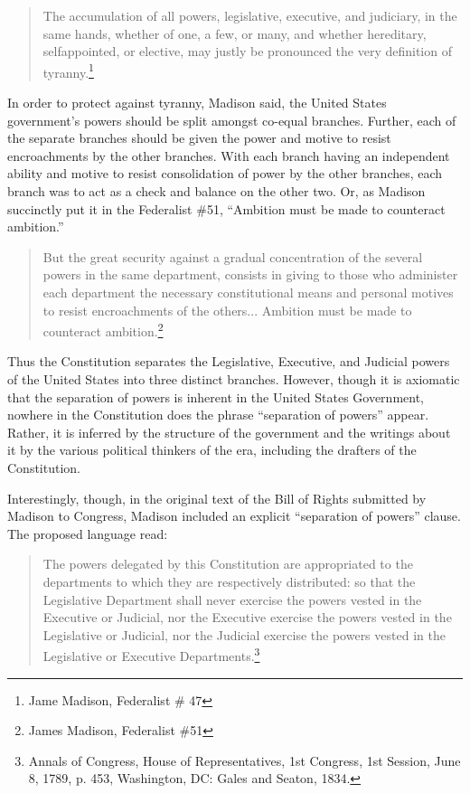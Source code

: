 \begin{quote}
The accumulation of all powers, legislative, executive, and judiciary, in the same hands, whether of one, a few, or many, and whether hereditary, selfappointed, or elective, may justly be pronounced the very definition of tyranny.\footnote{Jame Madison, Federalist \# 47}
\end{quote}

In order to protect against tyranny, Madison said, the United States government's powers should be split amongst co-equal branches.  Further, each of the separate branches should be given the power and motive to resist encroachments by the other branches.  With each branch having an independent ability and motive to resist consolidation of power by the other branches, each branch was to act as a check and balance on the other two.  Or, as Madison succinctly put it in the Federalist \#51, ``Ambition must be made to counteract ambition.''

\begin{quote}
But the great security against a gradual concentration of the several powers in the same department, consists in giving to those who administer each department the necessary constitutional means and personal motives to resist encroachments of the others... Ambition must be made to counteract ambition.\footnote{James Madison, Federalist \#51}
\end{quote}

Thus the Constitution separates the Legislative, Executive, and Judicial powers of the United States into three distinct branches.  However, though it is axiomatic that the separation of powers is inherent in the United States Government, nowhere in the Constitution does the phrase ``separation of powers'' appear.  Rather, it is inferred by the structure of the government and the writings about it by the various political thinkers of the era, including the drafters of the Constitution.

Interestingly, though, in the original text of the Bill of Rights submitted by Madison to Congress, Madison included an explicit ``separation of powers'' clause.  The proposed language read:
\begin{quote}
The powers delegated by this Constitution are appropriated to the departments to which they are respectively distributed: so that the Legislative Department shall never exercise the powers vested in the Executive or Judicial, nor the Executive exercise the powers vested in the Legislative or Judicial, nor the Judicial exercise the powers vested in the Legislative or Executive Departments.\footnote{Annals of Congress, House of Representatives, 1st Congress, 1st Session, June 8, 1789, p. 453, Washington, DC:  Gales and Seaton, 1834.}
\end{quote}

